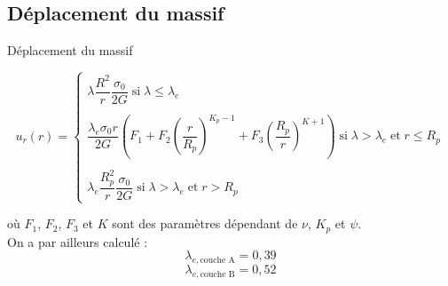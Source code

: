 \documentclass{beamer}
\begin{document}
\subsection{Déplacement du massif}

\begin{frame}{Déplacement du massif}

\[u_r(r)=\left\{\begin{array}{l}
\lambda\dfrac{R^2}{r}\dfrac{\sigma_0}{2G}\;\text{si}\;\lambda\leq\lambda_e\\\\
\dfrac{\lambda_e\sigma_0r}{2G}\left(F_1+F_2\left(\dfrac{r}{R_p}\right)^{K_p-1}+F_3\left(\dfrac{R_p}{r}\right)^{K+1}\right)\;\text{si}\;\lambda>\lambda_e\;\text{et}\;r\leq R_p\\\\
\lambda_e\dfrac{R_p^2}{r}\dfrac{\sigma_0}{2G}\;\text{si}\;\lambda>\lambda_e\;\text{et}\;r> R_p\end{array}\right.\]

où $F_1$, $F_2$, $F_3$ et $K$ sont des paramètres dépendant de $\nu$, $K_p$ et $\psi$.\\

On a par ailleurs calculé : \[\lambda_{e,\text{couche A}} = 0,39\]
\[\lambda_{e,\text{couche B}} = 0,52\]


    
\end{frame}
\end{document}
